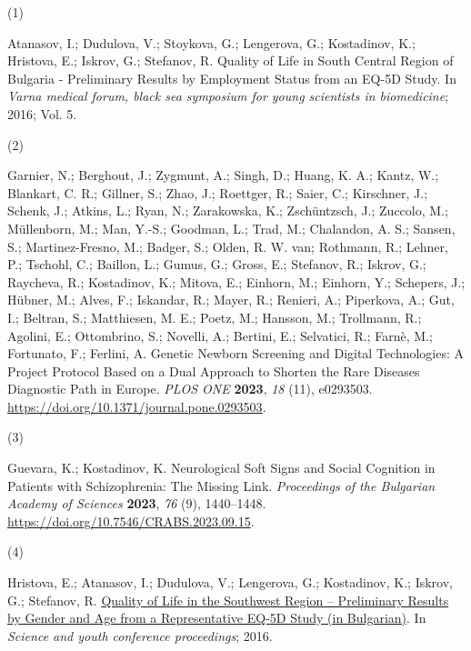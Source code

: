 \documentclass[
  12pt,
  letterpaper,
  DIV=11,
  numbers=noendperiod]{scrartcl}
\newlength{\cslhangindent}
\newlength{\csllabelwidth}
\newenvironment{CSLReferences}[2] %
 {\begin{list}{}{%
  \setlength{\itemindent}{0pt}
  \setlength{\leftmargin}{0pt}
  \setlength{\parsep}{0pt}
  \ifodd #1
   \setlength{\leftmargin}{\cslhangindent}
   \setlength{\itemindent}{-1\cslhangindent}
  \fi
  \setlength{\itemsep}{#2\baselineskip}}}
 {\end{list}}
\newcommand{\CSLLeftMargin}[1]{\parbox[t]{\csllabelwidth}{\strut#1\strut}}
\newcommand{\CSLRightInline}[1]{\parbox[t]{\linewidth - \csllabelwidth}{\strut#1\strut}}
\begin{document}
\label{refs}
\begin{CSLReferences}{0}{0}
\nocite{*}

\CSLLeftMargin{(1) }%
\CSLRightInline{Atanasov, I.; Dudulova, V.; Stoykova, G.; Lengerova, G.;
Kostadinov, K.; Hristova, E.; Iskrov, G.; Stefanov, R. Quality of Life
in South Central Region of Bulgaria - Preliminary Results by Employment
Status from an EQ-5D Study. In \emph{Varna medical forum, black sea
symposium for young scientists in biomedicine}; 2016; Vol. 5.}

\CSLLeftMargin{(2) }%
\CSLRightInline{Garnier, N.; Berghout, J.; Zygmunt, A.; Singh, D.;
Huang, K. A.; Kantz, W.; Blankart, C. R.; Gillner, S.; Zhao, J.;
Roettger, R.; Saier, C.; Kirschner, J.; Schenk, J.; Atkins, L.; Ryan,
N.; Zarakowska, K.; Zschüntzsch, J.; Zuccolo, M.; Müllenborn, M.; Man,
Y.-S.; Goodman, L.; Trad, M.; Chalandon, A. S.; Sansen, S.;
Martinez-Fresno, M.; Badger, S.; Olden, R. W. van; Rothmann, R.; Lehner,
P.; Tschohl, C.; Baillon, L.; Gumus, G.; Gross, E.; Stefanov, R.;
Iskrov, G.; Raycheva, R.; Kostadinov, K.; Mitova, E.; Einhorn, M.;
Einhorn, Y.; Schepers, J.; Hübner, M.; Alves, F.; Iskandar, R.; Mayer,
R.; Renieri, A.; Piperkova, A.; Gut, I.; Beltran, S.; Matthiesen, M. E.;
Poetz, M.; Hansson, M.; Trollmann, R.; Agolini, E.; Ottombrino, S.;
Novelli, A.; Bertini, E.; Selvatici, R.; Farnè, M.; Fortunato, F.;
Ferlini, A. Genetic Newborn Screening and Digital Technologies: A
Project Protocol Based on a Dual Approach to Shorten the Rare Diseases
Diagnostic Path in Europe. \emph{PLOS ONE} \textbf{2023}, \emph{18}
(11), e0293503. \url{https://doi.org/10.1371/journal.pone.0293503}.}

\CSLLeftMargin{(3) }%
\CSLRightInline{Guevara, K.; Kostadinov, K. Neurological Soft Signs and
Social Cognition in Patients with Schizophrenia: The Missing Link.
\emph{Proceedings of the Bulgarian Academy of Sciences} \textbf{2023},
\emph{76} (9), 1440--1448.
\url{https://doi.org/10.7546/CRABS.2023.09.15}.}

\CSLLeftMargin{(4) }%
\CSLRightInline{Hristova, E.; Atanasov, I.; Dudulova, V.; Lengerova, G.;
Kostadinov, K.; Iskrov, G.; Stefanov, R.
\href{https://asclepius.bg/cnm/wp-content/uploads/2022/05/Sbornik-nauka-i-mladost-2016.pdf}{Quality
of Life in the Southwest Region -- Preliminary Results by Gender and Age
from a Representative EQ-5D Study (in Bulgarian)}. In \emph{Science and
youth conference proceedings}; 2016.}


\end{CSLReferences}
\end{document}
